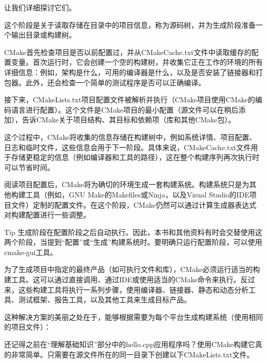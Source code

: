 让我们详细探讨它们。


这个阶段是关于读取存储在目录中的项目信息，称为源码树，并为生成阶段准备一个输出目录或构建树。

CMake首先检查项目是否以前配置过，并从CMakeCache.txt文件中读取缓存的配置变量。首次运行时，它会创建一个空的构建树，并收集它正在工作的环境的所有详细信息：例如，架构是什么，可用的编译器是什么，以及是否安装了链接器和打包器。此外，还会检查一个简单的测试程序是否可以正确编译。

接下来，CMakeLists.txt项目配置文件被解析并执行（CMake项目使用CMake的编码语言进行配置）。这个文件是CMake项目的最小配置（源文件可以在稍后添加），告诉CMake关于项目结构、其目标和依赖项（库和其他CMake包）。

这个过程中，CMake将收集的信息存储在构建树中，例如系统详情、项目配置、日志和临时文件，这些信息会用于下一阶段。具体来说，CMakeCache.txt文件用于存储更稳定的信息（例如编译器和工具的路径），这在整个构建序列再次执行时可以节省时间。


阅读项目配置后，CMake将为确切的环境生成一套构建系统。构建系统只是为其他构建工具（例如，GNU Make的Makefiles或Ninja，以及Visual Studio的IDE项目文件）定制的配置文件。在这个阶段，CMake仍然可以通过计算生成器表达式对构建配置进行一些调整。

\begin{myTip}{Tip}
生成阶段在配置阶段之后自动执行。因此，本书和其他资料有时会交替使用这两个阶段，当提到“配置”或“生成”构建系统时。要明确只运行配置阶段，可以使用cmake-gui工具。
\end{myTip}


为了生成项目中指定的最终产品（如可执行文件和库），CMake必须运行适当的构建工具。这可以通过直接调用、通过IDE或使用适当的CMake命令来执行。反过来，这些构建工具将执行一系列步骤，使用编译器、链接器、静态和动态分析工具、测试框架、报告工具，以及其他工具来生成目标产品。

这种解决方案的美丽之处在于，能够根据需要为每个平台生成构建系统（使用相同的项目文件）：


还记得之前在“理解基础知识”部分中的hello.cpp应用程序吗？使用CMake构建它真的非常简单。只需要在源文件所在的同一目录下创建以下CMakeLists.txt文件。


